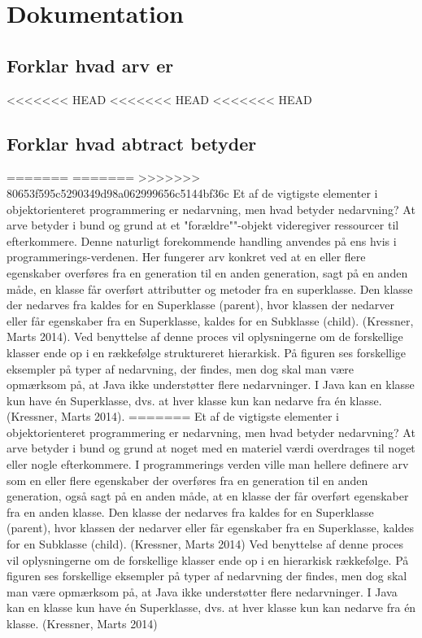 \section{Dokumentation}
\subsection{Forklar hvad arv er}
<<<<<<< HEAD
<<<<<<< HEAD
<<<<<<< HEAD

\subsection{Forklar hvad abtract betyder}
=======
=======
>>>>>>> 80653f595c5290349d98a062999656c5144bf36c
Et af de vigtigste elementer i objektorienteret programmering er nedarvning, men hvad betyder nedarvning? At arve betyder i bund og grund at et "forældre""-objekt videregiver ressourcer til efterkommere. Denne naturligt forekommende handling anvendes på ens hvis i programmerings-verdenen. Her fungerer arv konkret ved at en eller flere egenskaber overføres fra en generation til en anden generation, sagt på en anden måde, en klasse får overført attributter og metoder fra en superklasse. Den klasse der nedarves fra kaldes for en Superklasse (parent), hvor klassen der nedarver eller får egenskaber fra en Superklasse, kaldes for en Subklasse (child). (Kressner, Marts 2014).
Ved benyttelse af denne proces vil oplysningerne om de forskellige klasser ende op i en rækkefølge struktureret hierarkisk. 
På figuren ses forskellige eksempler på typer af nedarvning, der findes, men dog skal man være opmærksom på, at Java ikke understøtter flere nedarvninger. I Java kan en klasse kun have én Superklasse, dvs. at hver klasse kun kan nedarve fra én klasse. (Kressner, Marts 2014).
=======
Et af de vigtigste elementer i objektorienteret programmering er nedarvning, men hvad betyder nedarvning? At arve betyder i bund og grund at noget med en materiel værdi overdrages til noget eller nogle efterkommere. I programmerings verden ville man hellere definere arv som en eller flere egenskaber der overføres fra en generation til en anden generation, også sagt på en anden måde, at en klasse der får overført egenskaber fra en anden klasse. Den klasse der nedarves fra kaldes for en Superklasse (parent), hvor klassen der nedarver eller får egenskaber fra en Superklasse, kaldes for en Subklasse (child). (Kressner, Marts 2014)
Ved benyttelse af denne proces vil oplysningerne om de forskellige klasser ende op i en hierarkisk rækkefølge. 
På figuren ses forskellige eksempler på typer af nedarvning der findes, men dog skal man være opmærksom på, at Java ikke understøtter flere nedarvninger. I Java kan en klasse kun have én Superklasse, dvs. at hver klasse kun kan nedarve fra én klasse. (Kressner, Marts 2014)
